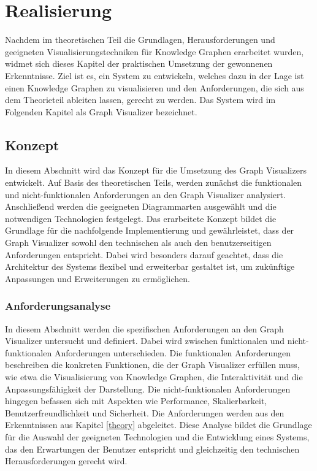 
\chapter{Realisierung}

Nachdem im theoretischen Teil die Grundlagen, Herausforderungen und geeigneten Visualisierungstechniken für Knowledge Graphen erarbeitet wurden, widmet sich dieses Kapitel der praktischen Umsetzung der gewonnenen Erkenntnisse. Ziel ist es, ein System zu entwickeln, welches dazu in der Lage ist einen Knowledge Graphen zu visualisieren und den Anforderungen, die sich aus dem Theorieteil ableiten lassen, gerecht zu werden. Das System wird im Folgenden Kapitel als Graph Visualizer bezeichnet.

\section{Konzept}

In diesem Abschnitt wird das Konzept für die Umsetzung des Graph Visualizers entwickelt. Auf Basis des theoretischen Teils, werden zunächst die funktionalen und nicht-funktionalen Anforderungen an den Graph Visualizer analysiert. Anschließend werden die geeigneten Diagrammarten ausgewählt und die notwendigen Technologien festgelegt. Das erarbeitete Konzept bildet die Grundlage für die nachfolgende Implementierung und gewährleistet, dass der Graph Visualizer sowohl den technischen als auch den benutzerseitigen Anforderungen entspricht. Dabei wird besonders darauf geachtet, dass die Architektur des Systems flexibel und erweiterbar gestaltet ist, um zukünftige Anpassungen und Erweiterungen zu ermöglichen.

\subsection{Anforderungsanalyse}

In diesem Abschnitt werden die spezifischen Anforderungen an den Graph Visualizer untersucht und definiert. Dabei wird zwischen funktionalen und nicht-funktionalen Anforderungen unterschieden. Die funktionalen Anforderungen beschreiben die konkreten Funktionen, die der Graph Visualizer erfüllen muss, wie etwa die Visualisierung von Knowledge Graphen, die Interaktivität und die Anpassungsfähigkeit der Darstellung. Die nicht-funktionalen Anforderungen hingegen befassen sich mit Aspekten wie Performance, Skalierbarkeit, Benutzerfreundlichkeit und Sicherheit. Die Anforderungen werden aus den Erkenntnissen aus Kapitel \ref{theory} abgeleitet. Diese Analyse bildet die Grundlage für die Auswahl der geeigneten Technologien und die Entwicklung eines Systems, das den Erwartungen der Benutzer entspricht und gleichzeitig den technischen Herausforderungen gerecht wird.


